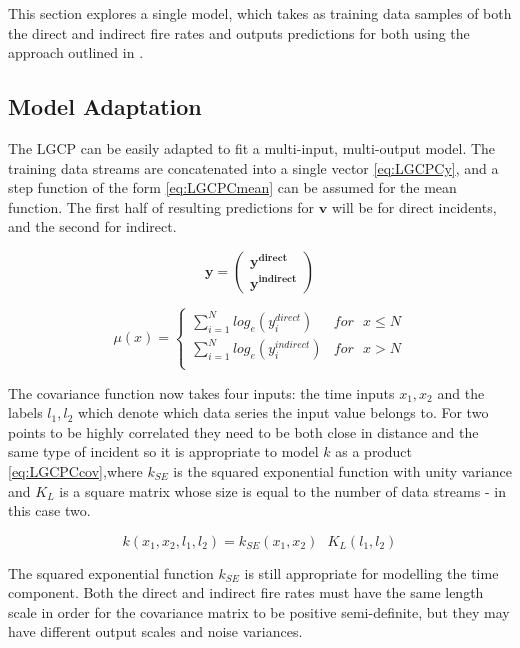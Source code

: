\documentclass[a4paper,11pt]{report}
\begin{document}
This section explores a single model, which takes as training data samples of both the direct and indirect fire rates and outputs predictions for both using the approach outlined in \cite{multi-outputGP}.

\subsection{Model Adaptation}

The LGCP can be easily adapted to fit a multi-input, multi-output model. The training data streams are concatenated into a single vector \ref{eq:LGCPCy}, and a step function of the form \ref{eq:LGCPCmean} can be assumed for the mean function. The first half of resulting predictions for \(\mathbf{v}\) will be for direct incidents, and the second for indirect.

\begin{equation} \label{eq:LGCPCy}
\mathbf{y} = \left( \begin{array}{cc}
\mathbf{y^{direct}} \\
\mathbf{y^{indirect}} \end{array} \right)
\end{equation}

\begin{equation} \label{eq:LGCPCmean}
\mu (x) = \begin{cases}  
\displaystyle \sum_{i=1}^{N} log_e(y_i^{direct}) & for \text{ }x\le N \\
\displaystyle \sum_{i=1}^{N}log_e(y_i^{indirect}) & for \text{ }x>N \\ \end{cases}
\end{equation}

The covariance function now takes four inputs: the time inputs \(x_1, x_2\) and the labels \(l_1,l_2\) which denote which data series the input value belongs to. For two points to be highly correlated they need to be both close in distance and the same type of incident so it is appropriate to model \(k\) as a product \ref{eq:LGCPCcov},where \(k_{SE}\) is the squared exponential function with unity variance and \(K_L\) is a square matrix whose size is equal to the number of data streams - in this case two. 

\begin{equation} \label{eq:LGCPCcov}
k(x_1,x_2,l_1,l_2) = k_{SE}(x_1,x_2) \text{ } K_L(l_1,l_2) 
\end{equation}

The squared exponential function \(k_{SE}\) is still appropriate for modelling the time component. Both the direct and indirect fire rates must have the same length scale in order for the covariance matrix to be positive semi-definite, but they may have different output scales and noise variances.
\end{document}
